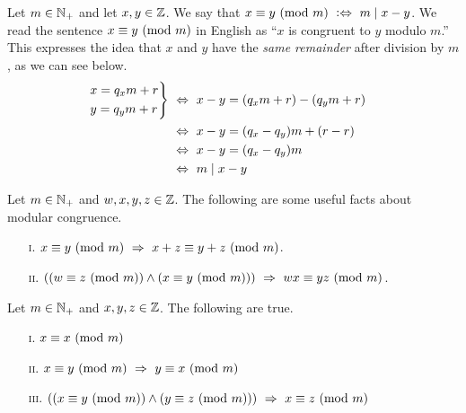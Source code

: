 \begin{definition}
    Let $m \in \mathbb{N}_+$ and let $x, y \in \mathbb{Z}$.
    We say that $\modulo{x}{y}{m} \iffdefn m \divides x - y$.
    We read the sentence $\congruent{x}{y}{m}$ in English as
    ``$x$ is congruent to $y$ modulo $m$.''
    This expresses the idea that $x$ and $y$ have the \emph{same remainder}
    after division by $m$, as we can see below.
    \begin{align*}
        \begin{rcases}
            x = q_xm + r\\
            y = q_ym + r
        \end{rcases}
            &\iff x - y = \pn*{q_xm + r} - \pn*{q_ym + r} \\
            &\iff x - y = \pn*{q_x - q_y}m + (r - r) \\
            &\iff x - y = \pn*{q_x - q_y}m \\
            &\iff m \divides x - y
    \end{align*}
\end{definition}

\begin{exercise}
    Let $m \in \mathbb{N}_+$ and $w, x, y, z \in \mathbb{Z}$.
    The following are some useful facts about modular congruence.
    \begin{enumerate}
        \item[\textsc{i.}]
            $\modulo{x}{y}{m} \implies \modulo{x + z}{y + z}{m}$.
        \item[\textsc{ii.}]
            $\pn*{\pn*{\modulo{w}{z}{m}} \meet \pn*{\modulo{x}{y}{m}}}
                \implies \modulo{wx}{yz}{m}$.
    \end{enumerate}
\end{exercise}

\begin{theorem}
    Let $m \in \mathbb{N}_+$ and $x, y, z \in \mathbb{Z}$.
    The following are true.
    \begin{enumerate}
        \item[\textsc{i.}]
            $\modulo{x}{x}{m}$
        \item[\textsc{ii.}]
            $\modulo{x}{y}{m} \implies \modulo{y}{x}{m}$
        \item[\textsc{iii.}]
            $\pn*{\pn*{\modulo{x}{y}{m}} \meet \pn*{\modulo{y}{z}{m}}}
                \implies \modulo{x}{z}{m}$
    \end{enumerate}
\end{theorem}

